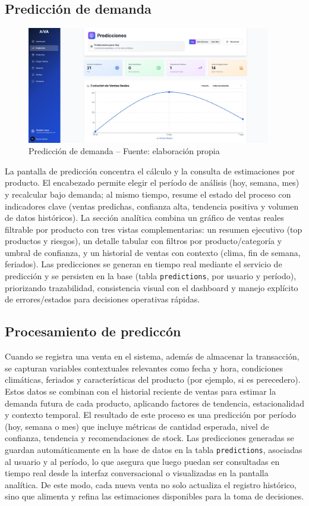 \subsection{Predicción de demanda}
\begin{figure}[!htbp]
\centering
\includegraphics[width=0.95\textwidth]{images/prediccionPage.png}
\caption{Predicción de demanda -- Fuente: elaboración propia}
\label{fig:ui-prediccion}
\end{figure}
La pantalla de predicción concentra el cálculo y la consulta de estimaciones por producto. El encabezado permite elegir el período de análisis (hoy, semana, mes) y recalcular bajo demanda; al mismo tiempo, resume el estado del proceso con indicadores clave (ventas predichas, confianza alta, tendencia positiva y volumen de datos históricos). La sección analítica combina un gráfico de ventas reales filtrable por producto con tres vistas complementarias: un resumen ejecutivo (top productos y riesgos), un detalle tabular con filtros por producto/categoría y umbral de confianza, y un historial de ventas con contexto (clima, fin de semana, feriados). Las predicciones se generan en tiempo real mediante el servicio de predicción y se persisten en la base (tabla \texttt{predictions}, por usuario y período), priorizando trazabilidad, consistencia visual con el dashboard y manejo explícito de errores/estados para decisiones operativas rápidas.

\subsection{Procesamiento de prediccón}
Cuando se registra una venta en el sistema, además de almacenar la transacción, se capturan variables contextuales relevantes como fecha y hora, condiciones climáticas, feriados y características del producto (por ejemplo, si es perecedero). Estos datos se combinan con el historial reciente de ventas para estimar la demanda futura de cada producto, aplicando factores de tendencia, estacionalidad y contexto temporal. El resultado de este proceso es una predicción por período (hoy, semana o mes) que incluye métricas de cantidad esperada, nivel de confianza, tendencia y recomendaciones de stock. Las predicciones generadas se guardan automáticamente en la base de datos en la tabla \texttt{predictions}, asociadas al usuario y al período, lo que asegura que luego puedan ser consultadas en tiempo real desde la interfaz conversacional o visualizadas en la pantalla analítica. De este modo, cada nueva venta no solo actualiza el registro histórico, sino que alimenta y refina las estimaciones disponibles para la toma de decisiones.


